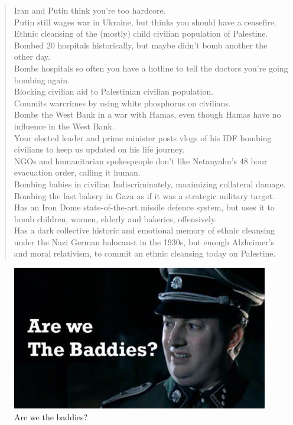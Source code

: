 \documentclass[16pt,openany,oneside]{book}
\begin{document}
\begin{quote}
    \> Iran and Putin think you're too hardcore.
    \\ 
    \> Putin still wages war in Ukraine, but thinks you should have a ceasefire. 
    \\ 
    \> Ethnic cleansing of the (mostly) child civilian population of Palestine.
    \\ 
    \> Bombed 20 hospitals historically, but maybe didn't bomb another the other day.
    \\ 
    \> Bombs hospitals so often you have a hotline to tell the doctors you're going bombing again.
    \\
    \> Blocking civilian aid to Palestinian civilian population.
    \\
    \> Commits warcrimes by using white phosphorus on civilians.
    \\
    \> Bombs the West Bank in a war with Hamas, even though Hamas have no influence in the West Bank.
    \\
    \> Your elected leader and prime minister posts vlogs of his IDF bombing civilians to keep us updated on his life journey.
    \\
    \> NGOs and humanitarian spokespeople don't like Netanyahu's 48 hour evacuation order, calling it human.
    \\
    \> Bombing babies in civilian Indiscriminately, maximizing collateral damage.
    \\
    \> Bombing the last bakery in Gaza as if it was a strategic military target.
    \\
    \> Has an Iron Dome state-of-the-art missile defence system, but uses it to bomb children, women, elderly and bakeries, offensively.
    \\
    \> Has a dark collective historic and emotional memory of ethnic cleansing under the Nazi German holocaust in the 1930s, but enough Alzheimer's and moral relativism, to commit an ethnic cleansing today on Palestine.
\end{quote}

\begin{figure} [H]
    \centering
    \includegraphics[width=0.5\linewidth]{assets/baddies.jpg}
    \caption{Are we the baddies?}
    \label{fig:baddies-3}
\end{figure}
\end{document}
